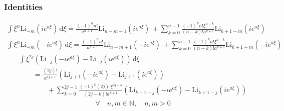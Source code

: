 \subsubsection{Identities}
\begin{align}
	\int \! \xi^{n}\mathrm{Li}_{-m}(ie^{a\xi}) \, \mathrm{d}\xi
	=  \frac{(-1)^n n!}{a^{n+1}} \mathrm{Li}_{n - m + 1}(ie^{a\xi}) \,
	+ \sum_{k=0}^{n-1} \!
	\frac{(-1)^k n! \xi^{n-k}}{(n-k)! a^{k+1}} \mathrm{Li}_{k+1-m}(ie^{a\xi})
\end{align}
\begin{align}
	\int \! \xi^{n}\mathrm{Li}_{-m}(-ie^{a\xi}) \, \mathrm{d}\xi
	=  \frac{(-1)^n n!}{a^{n+1}} \mathrm{Li}_{n - m + 1}(-ie^{a\xi}) \,
	+ \sum_{k=0}^{n-1} \!
	\frac{(-1)^k n! \xi^{n-k}}{(n-k)! a^{k+1}} \mathrm{Li}_{k+1-m}(-ie^{a\xi})
\end{align}
\begin{align}
	&\int \! \xi^{2j}\left(\mathrm{Li}_{-j}(-ie^{a\xi}) - \mathrm{Li}_{-j}(ie^{a\xi}) \right) \, \mathrm{d}\xi \\
	&\quad\quad = \frac{(2j)!}{a^{2j+1}} \left(
	\mathrm{Li}_{j + 1}(-ie^{a\xi})  - \mathrm{Li}_{j + 1}(ie^{a\xi}) 
	\right) \\
	&\quad\quad\quad\quad+ \sum_{k=0}^{2j-1} \!
	\frac{(-1)^k (2j)! \xi^{2j-k}}{(2j-k)! a^{k+1}} \left(
	\mathrm{Li}_{k+1-j}(-ie^{a\xi}) - \mathrm{Li}_{k+1-j}(ie^{a\xi})
	\right)
\end{align}
\begin{align}
	&\forall \quad n, m \in \mathbb{N}, \quad n, m > 0
\end{align}

